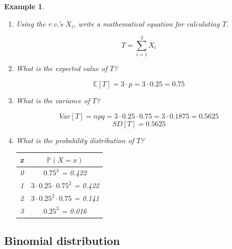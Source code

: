 \documentclass[12pt]{amsart}
\newtheorem{example}[theorem]{Example}
\begin{document}
{\begin{example}
\begin{enumerate}
\item Using the r.v.'s $X_i$, write a mathematical equation for calculating $T$.

\color{blue}
$$T = \sum_{i=1}^3 X_i$$
\color{black}

\item What is the expected value of $T$?

\vspace{1.5cm}
\color{blue}
$$\mathbb{E}[T] = 3\cdot p = 3\cdot0.25 = 0.75$$
\color{black}

\item What is the variance of $T$?

\vspace{2cm}
\color{blue}
$$Var[T] = npq = 3\cdot0.25\cdot0.75 = 3\cdot0.1875 = 0.5625$$
$$SD[T] = 0.5625$$

\color{black}


\item What is the probability distribution of $T$?

\color{blue}
\vspace{1cm}
\begin{tabular}{| c | c |}
  \hline                       
  x & $\mathbb{P}(X=x)$  \\
   \hline     
  0 & $0.75^3$ = 0.422\\
  1 & $ 3\cdot0.25\cdot0.75^2$ = 0.422\\
  2 & $ 3\cdot0.25^2\cdot0.75$  = 0.141\\
  3 &$0.25^3$ =  0.016\\
  \hline  
\end{tabular}
\color{black}

\end{enumerate}


\end{example} 


 \newpage




\subsection{Binomial distribution}

}
\end{document}
